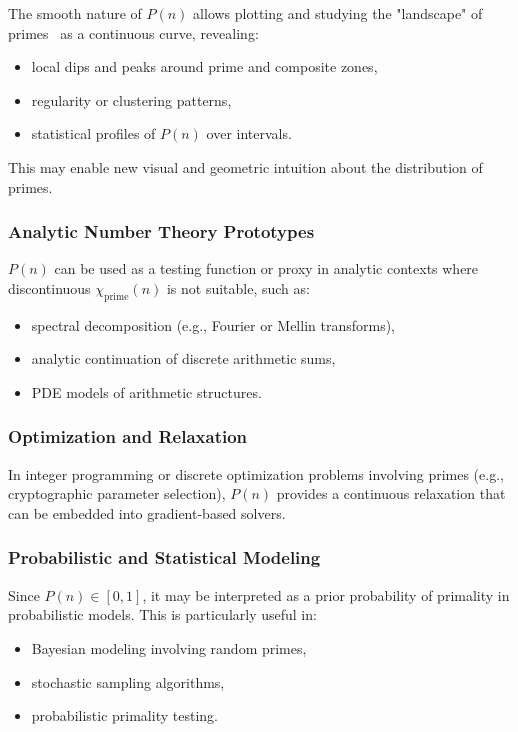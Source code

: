 \documentclass[12pt]{article}
\theoremstyle{definition}
\theoremstyle{plain}
\theoremstyle{remark}
\begin{document}
The smooth nature of \( P(n) \) allows plotting and studying the "landscape" of primes~\cite{rubinstein1994chebyshev} as a continuous curve, revealing:

\begin{itemize}
  \item local dips and peaks around prime and composite zones,
  \item regularity or clustering patterns,
  \item statistical profiles of \( P(n) \) over intervals.
\end{itemize}

This may enable new visual and geometric intuition about the distribution of primes.

\subsubsection{Analytic Number Theory Prototypes}

\( P(n) \) can be used as a testing function or proxy in analytic contexts where discontinuous \( \chi_{\mathrm{prime}}(n) \) is not suitable, such as:

\begin{itemize}
  \item spectral decomposition (e.g., Fourier or Mellin transforms),
  \item analytic continuation of discrete arithmetic sums,
  \item PDE models of arithmetic structures.
\end{itemize}

\subsubsection{Optimization and Relaxation}

In integer programming or discrete optimization problems involving primes (e.g., cryptographic parameter selection), \( P(n) \) provides a continuous relaxation that can be embedded into gradient-based solvers.

\subsubsection{Probabilistic and Statistical Modeling}

Since \( P(n) \in [0,1] \), it may be interpreted as a prior probability of primality in probabilistic models. This is particularly useful in:

\begin{itemize}
  \item Bayesian modeling involving random primes,
  \item stochastic sampling algorithms,
  \item probabilistic primality testing.
\end{itemize}
\end{document}
